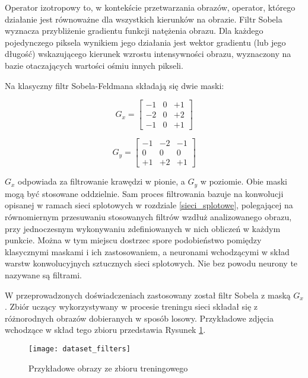     Operator izotropowy to, w kontekście przetwarzania obrazów, operator, którego
    działanie jest równoważne dla wszystkich kierunków na obrazie. Filtr Sobela
    wyznacza przybliżenie gradientu funkcji natężenia obrazu. Dla każdego pojedynczego
    piksela wynikiem jego działania jest wektor gradientu (lub jego długość) wskazującego kierunek wzrostu
    intensywności obrazu, wyznaczony na bazie otaczających wartości ośmiu innych pikseli.

    Na klasyczny filtr Sobela-Feldmana składają się dwie maski:

    \[G_x =
    \begin{bmatrix}
    -1 & 0 & +1 \\
    -2 & 0 & +2 \\
    -1 & 0 & +1
    \end{bmatrix}
    \]

    \[G_y =
    \begin{bmatrix}
    -1 & -2 & -1 \\
    0 & 0 & 0 \\
    +1 & +2 & +1
    \end{bmatrix}
    \]

    $G_x$ odpowiada za filtrowanie krawędzi w pionie, a $G_y$ w poziomie. Obie maski
    mogą być stosowane oddzielnie. Sam proces filtrowania bazuje na konwolucji
    opisanej w ramach sieci splotowych w rozdziale \ref{sieci_splotowe}, polegającej na
    równomiernym przesuwaniu stosowanych filtrów wzdłuż analizowanego obrazu, przy
    jednoczesnym wykonywaniu zdefiniowanych w nich obliczeń w każdym punkcie. Można
    w tym miejscu dostrzec spore podobieństwo pomiędzy klasycznymi maskami i ich zastosowaniem,
    a neuronami wchodzącymi w skład warstw konwolucyjnych sztucznych sieci splotowych. Nie bez powodu
    neurony te nazywane są filtrami.

    W przeprowadzonych doświadczeniach zastosowany został filtr Sobela z
    maską $G_x$. Zbiór uczący wykorzystywany w procesie treningu sieci składał się
    z różnorodnych obrazów dobieranych w sposób losowy. Przykładowe zdjęcia wchodzące
    w skład tego zbioru przedstawia Rysunek \ref{fig:dataset_filters}.

    \begin{figure}[H]
      \centering
      \texttt{[image: dataset\_filters]}
      \caption[Przykładowe obrazy ze zbioru treningowego - źródło: Praca własna]{Przykładowe obrazy ze zbioru treningowego}
      \label{fig:dataset_filters}
    \end{figure}


